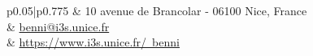 \documentclass[10pt]{article} %
\begin{document}
\begin{paracol}{2}
\parbox[top][0.08\textheight][c]{\linewidth}{ %
	\vspace{-0.02\textheight} %
	\colorbox{shade}{ %
		\begin{supertabular}{p{0.05\linewidth}|p{0.775\linewidth}} %
			\raisebox{-1pt}{\faHome} & 10 avenue de Brancolar - 06100 Nice, France \\ %
			\raisebox{0pt}{\small\faEnvelope} & \href{mailto:benni@i3s.unice.fr}{benni@i3s.unice.fr} \\ %
			\raisebox{-1pt}{\small\faDesktop} & \href{https://www.i3s.unice.fr/~benni}{https://www.i3s.unice.fr/~benni} \\ %
		\end{supertabular}
	}
}










\end{paracol}
\end{document}
